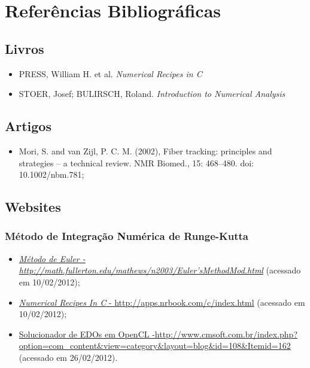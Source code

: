 \chapter{Referências Bibliográficas}

\section{Livros}
\begin{itemize}
  \item \label{numerical-recipes}PRESS, William H. et al. \textit{Numerical Recipes in C}
  \item \label{numerical-analysis}STOER, Josef; BULIRSCH, Roland. \textit{Introduction to Numerical Analysis}
\end{itemize}

\section{Artigos}
\begin{itemize}
  \item \label{fiber-tracking-article}Mori, S. and van Zijl, P. C. M. (2002), Fiber tracking: principles and strategies – a technical review. NMR Biomed., 15: 468–480. doi: 10.1002/nbm.781;
\end{itemize}

\section{Websites}
\subsection{Método de Integração Numérica de Runge-Kutta}
\begin{itemize}
  \item \href{http://math.fullerton.edu/mathews/n2003/Euler'sMethodMod.html}{\textit{Método de Euler - http://math.fullerton.edu/mathews/n2003/Euler'sMethodMod.html}} (acessado em 10/02/2012); 
  \item \href{http://apps.nrbook.com/c/index.html}{\textit{Numerical Recipes In C} - http://apps.nrbook.com/c/index.html} (acessado em 10/02/2012);
  \item \href{http://www.cmsoft.com.br/index.php?option=com_content&view=category&layout=blog&id=108&Itemid=162}{Solucionador de EDOs em OpenCL -\newline http://www.cmsoft.com.br/index.php?\newline option=com\_content\&view=category\&layout=blog\&id=108\&Itemid=162} (acessado em 26/02/2012).
\end{itemize}

